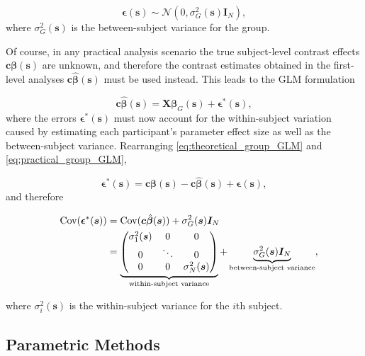 \begin{equation}
\label{eq:group_errors}
\bm{\epsilon}(\bm{s}) \sim  \mathcal{N}(0, \sigma_{G}^{2}(\bm{s})\bm{I}_{N}),
\end{equation}
where $\sigma_{G}^{2}(\bm{s})$ is the between-subject variance for the group. 

Of course, in any practical analysis scenario the true subject-level contrast effects $\bm{c}\bm{\beta}(\bm{s})$ are unknown, and therefore the contrast estimates obtained in the first-level analyses $\bm{c}\hat{\bm{\beta}}(\bm{s})$ must be used instead. This leads to the GLM formulation

\begin{equation} 
\label{eq:practical_group_GLM}
\bm{c}\hat{\bm{\beta}}(\bm{s}) = \bm{X}\bm{\beta}_{G}(\bm{s}) + \bm{\epsilon}^{*}(\bm{s}),
\end{equation}
where the errors $\bm{\epsilon}^{*}(\bm{s})$ must now account for the within-subject variation caused by estimating each participant's parameter effect size as well as the between-subject variance. Rearranging \ref{eq:theoretical_group_GLM} and \ref{eq:practical_group_GLM}, 

\begin{equation} 
\label{eq:practical_group_errors}
\bm{\epsilon}^{*}(\bm{s}) = \bm{c}\bm{\beta}(\bm{s}) - \bm{c}\hat{\bm{\beta}}(\bm{s}) + \bm{\epsilon}(\bm{s}),
\end{equation}
and therefore

\begin{alignat}{4}
&&\mathrm{Cov}(\bm{\epsilon}^{*}(\bm{s}))
&= \mathrm{Cov}(\bm{c}\hat{\bm{\beta}}(\bm{s})) + \sigma_{G}^{2}(\bm{s})\bm{I}_{N} \notag\\
&
&
&= \underbrace{\begin{pmatrix}
\sigma_{1}^{2}(\bm{s}) & 0 & 0 \\
0 & \ddots & 0 \\
0 & 0 & \sigma_{N}^{2}(\bm{s})
\end{pmatrix}}_{\text{within-subject variance}}
+ \underbrace{\sigma_{G}^{2}(\bm{s})\bm{I}_{N}}_{\text{between-subject variance}},
\end{alignat}

where $\sigma_{i}^{2}(\bm{s})$ is the within-subject variance for the $i$th subject. 

\subsection{Parametric Methods}

